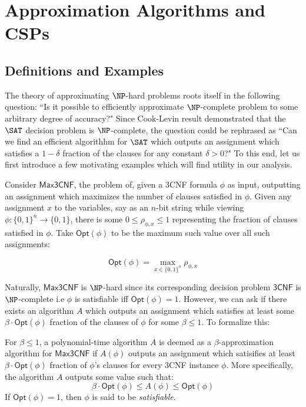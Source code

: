 \section{Approximation Algorithms and CSPs}
\subsection{Definitions and Examples}
The theory of approximating $\NP$-hard problems roots itself in the following question: ``Is it possible to efficiently approximate $\NP$-complete problem to some arbitrary degree of accuracy?" Since Cook-Levin result demonstrated that the $\SAT$ decision problem is $\NP$-complete, the question could be rephrased as ``Can we find an efficient algorithhm for $\SAT$ which outputs an assignment which satisfies a $1-\delta$ fraction of the clauses for any constant $\delta >  0$?" To this end, let us first introduce a few motivating examples which will find utility in our analysis. \newline

Consider $\mathsf{Max3CNF}$, the problem of, given a 3CNF formula $\phi$ as input, outputting an assignment which maximizes the number of clauses satisfied in $\phi$. Given any assignment $x$ to the variables, say as an $n$-bit string while viewing $\phi:\{0,1\}^n \rightarrow \{0,1\}$, there is some $0 \leq \rho_{\phi,x} \leq 1$ representing the fraction of clauses satisfied in $\phi$. Take $\mathsf{Opt}(\phi)$ to be the maximum such value over all such assignments:

\[ \mathsf{Opt}(\phi) = \max_{x \in \{0,1\}^n}\rho_{\phi,x} \]

Naturally, $\mathsf{Max3CNF}$ is $\NP$-hard since its corresponding decision problem $\mathsf{3CNF}$ is $\NP$-complete i.e $\phi$ is satisfiable iff $\mathsf{Opt}(\phi) = 1$.
%
However, we can ask if there exists an algorithm $A$ which outputs an assignment which satisfies at least some $\beta\cdot\mathsf{Opt}(\phi)$ fraction of the clauses of $\phi$ for some $\beta \leq 1$. To formalize this: \newline
%
\begin{definition} \label{Opt3SATDef}
For $\beta \leq 1$, a polynomial-time algorithm $A$ is deemed as a $\beta$-approximation algorithm for $\mathsf{Max3CNF}$ if $A(\phi)$ outputs an assignment which satisifies at least $\beta\cdot\mathsf{Opt}(\phi)$ fraction of $\phi$'s clauses for every 3CNF instance $\phi$. More specifically, the algorithm $A$ outputs some value such that:
\begin{equation}
  \beta\cdot\mathsf{Opt}(\phi) \leq A(\phi) \leq \mathsf{Opt}(\phi)
\end{equation}
If $\mathsf{Opt}(\phi) = 1$, then $\phi$ is said to be \emph{satisfiable}.
\end{definition}

